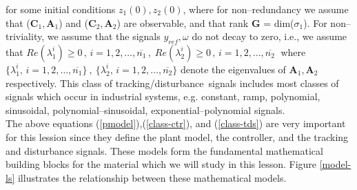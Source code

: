 \documentclass[a4paper,11pt]{article} %
\theoremstyle{plain} %
{\theorembodyfont{\normalfont}
\newtheorem{Exa}{Example}}
\def\td{tracking/disturbance}
\newcommand{\matr}[1]{\mathbf{#1}}
\begin{document}
for some initial conditions $z_1(0), z_2(0)$, where for non--redundancy we assume that ($\matr{C}_1, \matr{A}_1$) and ($\matr{C}_2, \matr{A}_2$) are observable, and that rank $\matr{G}$ = dim($\sigma_1$). For non--triviality, we assume that the signals $y_{ref}, \omega$ do not decay to zero, i.e., we assume that $Re(\lambda_{1}^i)\geq 0 \, , \,i=1,2,\ldots,\overline{n_1} \, , \; Re(\lambda_{2}^i)\geq 0 \, , \, i=1,2,\ldots,\overline{n_2} \;$ where $\{ \lambda_{1}^i,\, i=1,2,\ldots, \overline{n_1} \} \:,\: \{ \lambda_{2}^i,
\,i=1,2,\ldots, \overline{n_2} \}$ denote the eigenvalues of $\matr{A}_1, \matr{A}_2$ respectively. This class of \td\ signals includes most classes of signals which occur in industrial systems, e.g. constant, ramp, polynomial, sinusoidal, polynomial--sinusoidal, exponential--polynomial signals.\\

The above equations (\ref{pmodel}),(\ref{class-ctr}), and (\ref{class-tds}) are very important for this lession since they define the plant model, the controller, and the tracking and disturbance signals. These models form the fundamental
mathematical building blocks for the material which we will study in this lesson. Figure \ref{model-ls} illustrates the relationship between these mathematical models.\\
\end{document}
